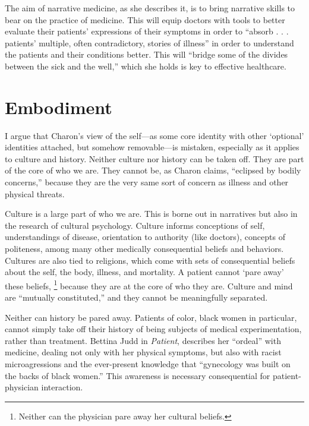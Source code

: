 \documentclass[12pt]{article}
\begin{document}
The aim of narrative medicine, as she describes it, is to bring narrative
skills to bear on the practice of medicine. This will equip doctors with tools
to better evaluate their patients' expressions of their symptoms in order to
``absorb . . . patients' multiple, often contradictory, stories of
illness''\autocite[p.~4]{Charon06} in order to understand the patients and
their conditions better. This will ``bridge some of the divides between the
sick and the well,''\autocite[p.~12]{Charon06} which she holds is key to
effective healthcare.

\section{Embodiment}

I argue that Charon's view of the self---as some core identity with other
`optional' identities attached, but somehow removable---is mistaken, especially
as it applies to culture and history.
Neither culture nor history can be taken off. They are part of the core of who we are.
They cannot be, as Charon claims, ``eclipsed by bodily concerns,'' because they
are the very same sort of concern as illness and other physical threats.

Culture is a large part of who we are. This is borne out in narratives but also
in the research of cultural psychology. Culture informs conceptions of
self,\autocite{Markus10} understandings of disease,\autocite{Fadiman97}
orientation to authority (like doctors)\autocite{Tyler00}, concepts of
politeness,\autocite{Yin09} among many other medically consequential beliefs
and behaviors. Cultures are also tied to religions, which come with sets of
consequential beliefs about the self, the body, illness, and mortality. A 
patient cannot `pare away' these beliefs,%
	\footnote{Neither can the physician pare away her cultural beliefs.}
because they are at the core of who they are. Culture and mind are ``mutually
constituted,''\autocite[p.~1423]{Heine10} and they cannot be meaningfully
separated.

Neither can history be pared away. Patients of color, black women in
particular, cannot simply take off their history of being subjects of medical
experimentation, rather than treatment. Bettina Judd in
\emph{Patient},\autocite{Judd14} describes her ``ordeal'' with medicine, 
dealing not only with her physical symptoms, but also with racist
microagressions and the ever-present knowledge that ``gynecology was built on
the backs of black women.''\autocite{Judd15} This awareness is necessary
consequential for patient-physician interaction.
\end{document}
